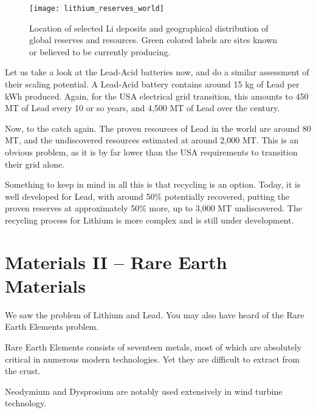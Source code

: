 \begin{figure*}[h]
	\texttt{[image: lithium\_reserves\_world]}
	\caption[Location of selected Li deposits and geographical distribution of global reserves and resources. Green colored labels are sites
known or believed to be currently producing.]{Location of selected Li deposits and geographical distribution of global reserves and resources. Green colored labels are sites known or believed to be currently producing.}
\end{figure*}

Let us take a look at the Lead-Acid batteries now, and do a similar assessment of their scaling potential. A Lead-Acid battery contains around 15 kg of Lead per kWh produced. Again, for the USA electrical grid transition, this amounts to 450 MT of Lead every 10 or so years, and 4,500 MT of Lead over the century.

Now, to the catch again. The proven resources of Lead in the world are around 80 MT, and the undiscovered resources estimated at around 2,000 MT. This is an obvious problem, as it is by far lower than the USA requirements to transition their grid alone.

Something to keep in mind in all this is that recycling is an option. Today, it is well developed for Lead, with around 50\% potentially recovered, putting the proven reserves at approximately 50\% more, up to 3,000 MT undiscovered. The recycling process for Lithium is more complex and is still under development. 

\section{Materials II -- Rare Earth Materials}


We saw the problem of Lithium and Lead. You may also have heard of the Rare Earth Elements problem.

\begin{kaobox}[frametitle=Rare Earth Materials]

Rare Earth Elements consists of seventeen metals, most of which are absolutely critical in numerous modern technologies. Yet they are difficult to extract from the crust.

Neodymium and Dysprosium are notably used extensively in wind turbine technology.

\end{kaobox}

